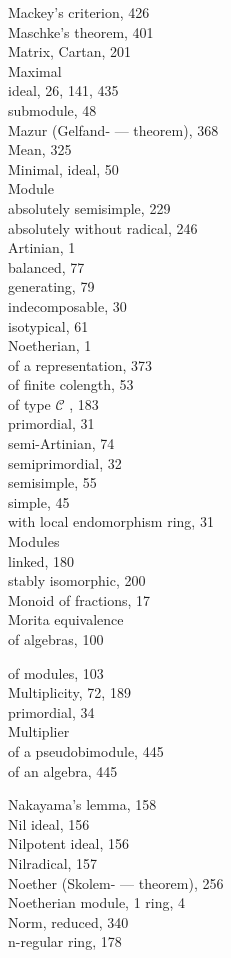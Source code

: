 Mackey's criterion, 426\\
Maschke's theorem, 401\\
Matrix, Cartan, 201\\
Maximal\\
ideal, 26, 141, 435\\
submodule, 48\\
Mazur (Gelfand- --- theorem), 368\\
Mean, 325\\
Minimal, ideal, 50\\
Module\\
absolutely semisimple, 229\\
absolutely without radical, 246\\
Artinian, 1\\
balanced, 77\\
generating, 79\\
indecomposable, 30\\
isotypical, 61\\
Noetherian, 1\\
of a representation, 373\\
of finite colength, 53\\
of type \(\mathcal{C}\) , 183\\
primordial, 31\\
semi-Artinian, 74\\
semiprimordial, 32\\
semisimple, 55\\
simple, 45\\
with local endomorphism ring, 31\\
Modules\\
linked, 180\\
stably isomorphic, 200\\
Monoid of fractions, 17\\
Morita equivalence\\
of algebras, 100

of modules, 103\\
Multiplicity, 72, 189\\
primordial, 34\\
Multiplier\\
of a pseudobimodule, 445\\
of an algebra, 445


Nakayama's lemma, 158\\
Nil ideal, 156\\
Nilpotent ideal, 156\\
Nilradical, 157\\
Noether (Skolem- --- theorem), 256\\
Noetherian module, 1 ring, 4\\
Norm, reduced, 340\\
n-regular ring, 178

